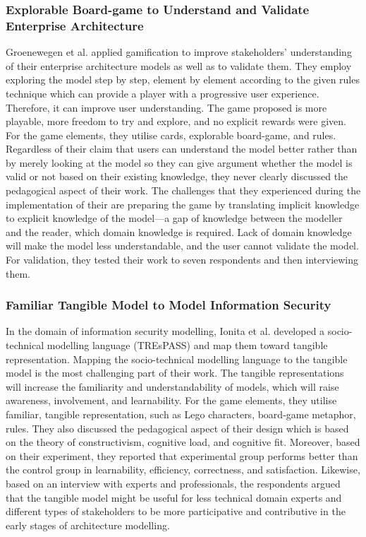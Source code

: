 \documentclass[12pt, a4paper]{report}
\begin{document}
\subsubsection{Explorable Board-game to Understand and Validate Enterprise Architecture}
Groenewegen et al. \cite{Groenewegen2010} applied gamification to improve stakeholders' understanding of their enterprise architecture models as well as to validate them. They employ exploring the model step by step, element by element according to the given rules technique which can provide a player with a progressive user experience. Therefore, it can improve user understanding. The game proposed is more playable, more freedom to try and explore, and no explicit rewards were given. For the game elements, they utilise cards, explorable board-game, and rules. 
Regardless of their claim that users can understand the model better rather than by merely looking at the model so they can give argument whether the model is valid or not based on their existing knowledge, they never clearly discussed the pedagogical aspect of their work. The challenges that they experienced during the implementation of their are preparing the game by translating implicit knowledge to explicit knowledge of the model—a gap of knowledge between the modeller and the reader, which domain knowledge is required. Lack of domain knowledge will make the model less understandable, and the user cannot validate the model. For validation, they tested their work to seven respondents and then interviewing them. 

\subsubsection{Familiar Tangible Model to Model Information Security}
In the domain of information security modelling, Ionita et al.\cite{Ionita2015} developed a socio-technical modelling language (TREsPASS) and map them toward tangible representation. Mapping the socio-technical modelling language to the tangible model is the most challenging part of their work. The tangible representations will increase the familiarity and understandability of models, which will raise awareness, involvement, and learnability. For the game elements, they utilise familiar, tangible representation, such as Lego characters, board-game metaphor, rules. They also discussed the pedagogical aspect of their design which is based on the theory of constructivism, cognitive load, and cognitive fit. Moreover, based on their experiment, they reported that experimental group performs better than the control group in learnability, efficiency, correctness, and satisfaction. Likewise, based on an interview with experts and professionals, the respondents argued that the tangible model might be useful for less technical domain experts and different types of stakeholders to be more participative and contributive in the early stages of architecture modelling.
\end{document}
